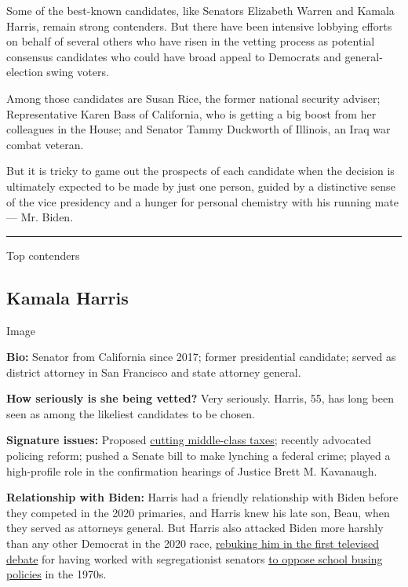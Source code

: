Some of the best-known candidates, like Senators Elizabeth Warren and
Kamala Harris, remain strong contenders. But there have been intensive
lobbying efforts on behalf of several others who have risen in the
vetting process as potential consensus candidates who could have broad
appeal to Democrats and general-election swing voters.

Among those candidates are Susan Rice, the former national security
adviser; Representative Karen Bass of California, who is getting a big
boost from her colleagues in the House; and Senator Tammy Duckworth of
Illinois, an Iraq war combat veteran.

But it is tricky to game out the prospects of each candidate when the
decision is ultimately expected to be made by just one person, guided by
a distinctive sense of the vice presidency and a hunger for personal
chemistry with his running mate --- Mr. Biden.

\begin{center}\rule{0.5\linewidth}{\linethickness}\end{center}

Top contenders

\hypertarget{kamala-harris}{%
\subsection{Kamala Harris}\label{kamala-harris}}

Image

\textbf{Bio:} Senator from California since 2017; former presidential
candidate; served as district attorney in San Francisco and state
attorney general.

\textbf{How seriously is she being vetted?} Very seriously. Harris, 55,
has long been seen as among the likeliest candidates to be chosen.

\textbf{Signature issues:} Proposed
\href{https://www.nytimes.com/2019/05/01/us/politics/cory-booker-kamala-harris-2020.html}{cutting
middle-class taxes}; recently advocated policing reform; pushed a Senate
bill to make lynching a federal crime; played a high-profile role in the
confirmation hearings of Justice Brett M. Kavanaugh.

\textbf{Relationship with Biden:} Harris had a friendly relationship
with Biden before they competed in the 2020 primaries, and Harris knew
his late son, Beau, when they served as attorneys general. But Harris
also attacked Biden more harshly than any other Democrat in the 2020
race,
\href{https://www.nytimes.com/2019/07/31/us/politics/kamala-harris-biden-busing.html}{rebuking
him in the first televised debate} for having worked with segregationist
senators
\href{https://www.nytimes.com/2019/07/15/us/politics/biden-busing.html?action=click\&module=RelatedLinks\&pgtype=Article}{to
oppose school busing policies} in the 1970s.

